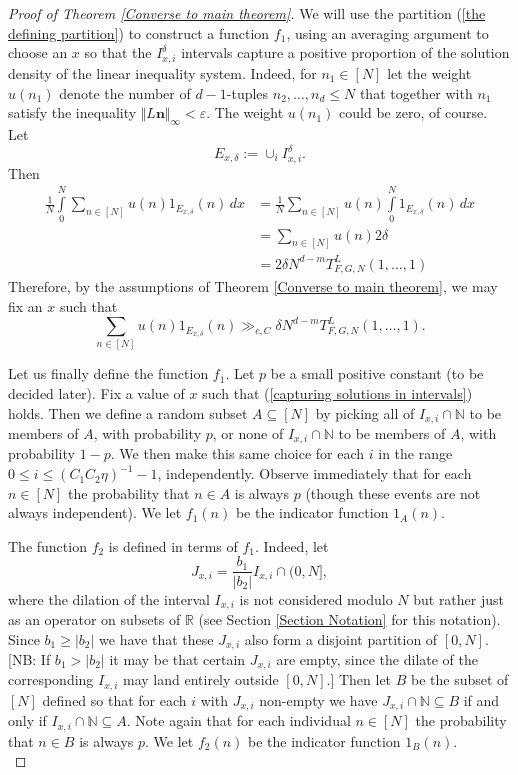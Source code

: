 \documentclass[12pt,a4paper,twoside,reqno]{amsart}
\numberwithin{equation}{section}
\begin{document}
\begin{proof}[Proof of Theorem \ref{Converse to main theorem}]
We will use the partition (\ref{the defining partition}) to construct a function $f_1$, using an averaging argument to choose an $x$ so that the $I_{x,i}^\delta$ intervals capture a positive proportion of the solution density of the linear inequality system. Indeed, for $n_1\in [N]$ let the weight $u(n_1)$ denote the number of $d-1$-tuples $n_2,\dots,n_d\leqslant N$ that together with $n_1$ satisfy the inequality $\Vert L\mathbf{n}\Vert_\infty < \varepsilon$. The weight $u(n_1)$ could be zero, of course. Let \[E_{x,\delta} := \cup_i I_{x,i}^\delta.\] Then
\begin{align*}
\frac{1}{N}\int\limits_{0}^N \sum\limits_{n\in [N]} u(n) 1_{E_{x,\delta}}(n) \, dx & = \frac{1}{N}\sum\limits_{n\in [N]} u(n)\int\limits_{0}^N 1_{E_{x,\delta}}(n)\, dx  \\
& = \sum\limits_{n\in [N]} u(n) 2\delta \\
& = 2\delta N^{d-m}T_{F,G,N}^L(1,\dots,1)
\end{align*}
\noindent Therefore, by the assumptions of Theorem \ref{Converse to main theorem}, we may fix an $x$ such that 
\begin{equation}
\label{capturing solutions in intervals}
\sum\limits_{n\in [N]} u(n) 1_{E_{x,\delta}}(n) \gg_{c,C} \delta N^{d-m}T_{F,G,N}^L(1,\dots,1).
\end{equation} 

Let us finally define the function $f_1$. Let $p$ be a small positive constant (to be decided later). Fix a value of $x$ such that (\ref{capturing solutions in intervals}) holds. Then we define a random subset $A\subseteq[N]$ by picking all of $I_{x,i} \cap \mathbb{N}$ to be members of $A$, with probability $p$, or none of $I_{x,i} \cap \mathbb{N}$ to be members of $A$, with probability $1-p$. We then make this same choice for each $i$ in the range $0\leqslant i \leqslant (C_1C_2\eta)^{-1} - 1$, independently. Observe immediately that for each $n\in [N]$ the probability that $n\in A$ is always $p$ (though these events are not always independent). We let $f_1(n)$ be the indicator function $1_A(n)$. 

The function $f_2$ is defined in terms of $f_1$. Indeed, let $$J_{x,i} = \frac{b_1}{\vert b_2\vert} I_{x,i}\cap (0,N],$$ where the dilation of the interval $I_{x,i}$ is not considered modulo $N$ but rather just as an operator on subsets of $\mathbb{R}$ (see Section \ref{Section Notation} for this notation). Since $b_1\geqslant \vert b_2\vert$ we have that these $J_{x,i}$ also form a disjoint partition of $[0,N]$. [NB: If $b_1>\vert b_2\vert$ it may be that certain $J_{x,i}$ are empty, since the dilate of the corresponding $I_{x,i}$ may land entirely outside $[0,N]$.] Then let $B$ be the subset of $[N]$ defined so that for each $i$ with $J_{x,i}$ non-empty we have $J_{x,i}\cap \mathbb{N}\subseteq B$ if and only if $I_{x,i}\cap \mathbb{N}\subseteq A$. Note again that for each individual $n\in [N]$ the probability that $n\in B$ is always $p$. We let $f_2(n)$ be the indicator function $1_B(n)$. \\


\end{proof}
\end{document}

